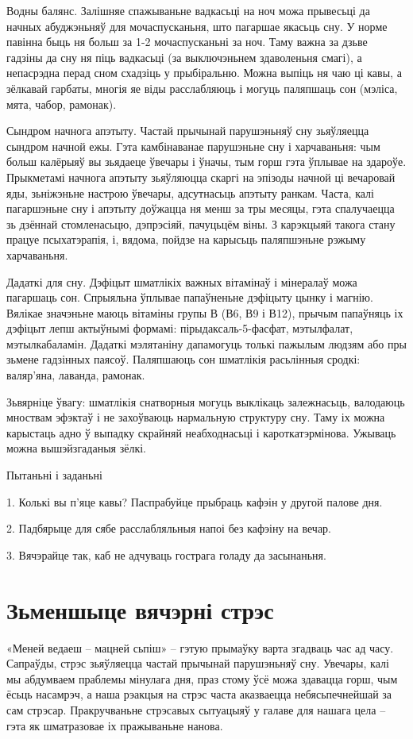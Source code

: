 Водны балянс. Залішняе спажываньне вадкасьці на ноч можа прывесьці да начных абуджэньняў для мочаспусканьня, што пагаршае якасьць сну. У норме павінна быць ня больш за 1-2 мочаспусканьні за ноч. Таму важна за дзьве гадзіны да сну ня піць вадкасьці (за выключэньнем здаволеньня смагі), а непасрэдна перад сном схадзіць у прыбіральню. Можна выпіць ня чаю ці кавы, а зёлкавай гарбаты, многія яе віды расслабляюць і могуць паляпшаць сон (мэліса, мята, чабор, рамонак).

Сындром начнога апэтыту. Частай прычынай парушэньняў сну зьяўляецца сындром начной ежы. Гэта камбінаванае парушэньне сну і харчаваньня: чым больш калёрыяў вы зьядаеце ўвечары і ўначы, тым горш гэта ўплывае на здароўе. Прыкметамі начнога апэтыту зьяўляюцца скаргі на эпізоды начной ці вечаровай яды, зьніжэньне настрою ўвечары, адсутнасьць апэтыту ранкам. Часта, калі пагаршэньне сну і апэтыту доўжацца ня менш за тры месяцы, гэта спалучаецца зь дзённай стомленасьцю, дэпрэсіяй, пачуцьцём віны. З карэкцыяй такога стану працуе псыхатэрапія, і, вядома, пойдзе на карысьць паляпшэньне рэжыму харчаваньня.

Дадаткі для сну. Дэфіцыт шматлікіх важных вітамінаў і мінералаў можа пагаршаць сон. Спрыяльна ўплывае папаўненьне дэфіцыту цынку і магнію. Вялікае значэньне маюць вітаміны групы В (В6, В9 і В12), прычым папаўняць іх дэфіцыт лепш актыўнымі формамі: пірыдаксаль-5-фасфат, мэтылфалат, мэтылкабаламін. Дадаткі мэлятаніну дапамогуць толькі пажылым людзям або пры зьмене гадзінных паясоў. Паляпшаюць сон шматлікія расьлінныя сродкі: валяр'яна, лаванда, рамонак.

Зьвярніце ўвагу: шматлікія снатворныя могуць выклікаць залежнасьць, валодаюць мноствам эфэктаў і не захоўваюць нармальную структуру сну. Таму іх можна карыстаць адно ў выпадку скрайняй неабходнасьці і кароткатэрмінова. Ужываць можна вышэйзгаданыя зёлкі.

Пытаньні і заданьні

1. Колькі вы п'яце кавы? Паспрабуйце прыбраць кафэін у другой палове дня.

2. Падбярыце для сябе расслабляльныя напоі без кафэіну на вечар.

3. Вячэрайце так, каб не адчуваць гострага голаду да засынаньня.


\section{Зьменшыце вячэрні стрэс}

«Меней ведаеш – мацней сьпіш» – гэтую прымаўку варта згадваць час ад часу. Сапраўды, стрэс зьяўляецца частай прычынай парушэньняў сну. Увечары, калі мы абдумваем праблемы мінулага дня, праз стому ўсё можа здавацца горш, чым ёсьць насамрэч, а наша рэакцыя на стрэс часта аказваецца небясьпечнейшай за сам стрэсар. Пракручваньне стрэсавых сытуацыяў у галаве для нашага цела – гэта як шматразовае іх пражываньне нанова.

